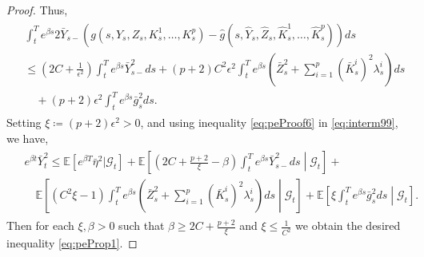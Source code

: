 \documentclass[11pt,a4paper]{article}
\numberwithin{equation}{section}
\theoremstyle{newPlain}
\theoremstyle{newDefinition}
\theoremstyle{newRemark}
\begin{document}
{\begin{proof}
    Thus,
    \begin{align}\label{eq:peProof6}
        \begin{aligned}
            &\int_t^T e^{\beta s}2\bar{Y}_{s-}(g(s,Y_s,Z_s,K_s^1,\ldots,K_s^p) - \hat{g}(s,\hat{Y}_s,\hat{Z}_s,\hat{K}_s^1,\ldots,\hat{K}_s^p))ds \\&\le \left(2C+\frac{1}{\epsilon^2}\right)\int_t^Te^{\beta s}\bar{Y}_{s-}^2ds + (p+2)C^2\epsilon^2\int_t^Te^{\beta s}\left(\bar{Z}_s^2 + \sum_{i=1}^p(\bar{K}_s^i)^2\lambda_s^i\right)ds  \\&\quad+(p+2)\epsilon^2\int_t^Te^{\beta s}\bar{g}_s^2ds.
        \end{aligned}
    \end{align}
    Setting $\xi\coloneqq(p+2)\epsilon^2>0$, and using inequality \eqref{eq:peProof6} in \eqref{eq:interm99}, we have,
    \begin{align}\label{eq:peProof7}
        \begin{aligned}
            &e^{\beta t}\bar{Y}_t^2 \le \mathbb{E}[e^{\beta T}\bar{\eta}^2|\mathcal{G}_t] + \mathbb{E}\left[\left(2C + \frac{p+2}{\xi} - \beta\right)\int_t^Te^{\beta s}\bar{Y}_{s-}^2ds\middle|\mathcal{G}_t\right] +\\
            &\quad\mathbb{E}\left[(C^2\xi-1)\int_t^Te^{\beta s}\left(\bar{Z}_s^2+\sum_{i=1}^p(\bar{K}_s^i)^2\lambda_s^i\right)ds\middle|\mathcal{G}_t\right] + \mathbb{E}\left[\xi\int_t^Te^{\beta s}\bar{g}_s^2ds\middle|\mathcal{G}_t\right].
        \end{aligned}
    \end{align}
    Then for each $\xi,\beta>0$ such that $\beta \ge 2C + \frac{p+2}{\xi}$ and $\xi\le\frac{1}{C^2}$ we obtain the desired inequality  \eqref{eq:peProp1}.
    


\end{proof}}
\end{document}
